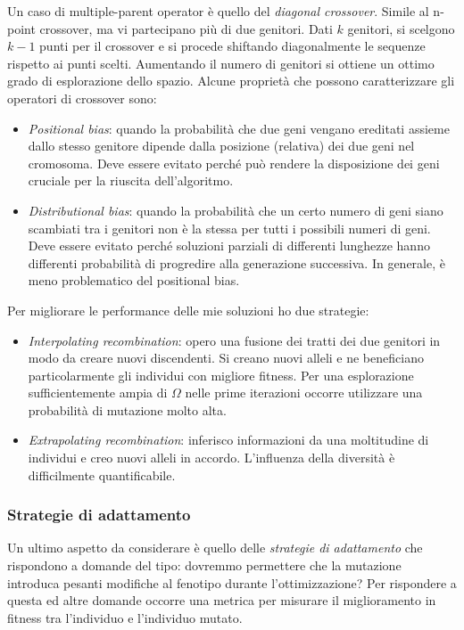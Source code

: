 \documentclass[10pt,a4paper]{article}
\begin{document}
Un caso di multiple-parent operator è quello del \emph{diagonal crossover}. Simile al n-point crossover, ma vi partecipano più di due genitori. Dati $k$ genitori, si scelgono $k-1$ punti per il crossover e si procede shiftando diagonalmente le sequenze rispetto ai punti scelti. Aumentando il numero di genitori si ottiene un ottimo grado di esplorazione dello spazio. Alcune proprietà che possono caratterizzare gli operatori di crossover sono:

\begin{itemize}
\item{\emph{Positional bias}: quando la probabilità che due geni vengano ereditati assieme dallo stesso genitore dipende dalla posizione (relativa) dei due geni nel cromosoma. Deve essere evitato perché può rendere la disposizione dei geni cruciale per la riuscita dell'algoritmo.}
\item{\emph{Distributional bias}: quando la probabilità che un certo numero di geni siano scambiati tra i genitori non è la stessa per tutti i possibili numeri di geni. Deve essere evitato perché soluzioni parziali di differenti lunghezze hanno differenti probabilità di progredire alla generazione successiva. In generale, è meno problematico del positional bias.}
\end{itemize}

Per migliorare le performance delle mie soluzioni ho due strategie:

\begin{itemize}
\item{\emph{Interpolating recombination}: opero una fusione dei tratti dei due genitori in modo da creare nuovi discendenti. Si creano nuovi alleli e ne beneficiano particolarmente gli individui con migliore fitness. Per una esplorazione sufficientemente ampia di $\Omega$ nelle prime iterazioni occorre utilizzare una probabilità di mutazione molto alta.}
\item{\emph{Extrapolating recombination}: inferisco informazioni da una moltitudine di individui e creo nuovi alleli in accordo. L'influenza della diversità è difficilmente quantificabile.}
\end{itemize}

\subsubsection{Strategie di adattamento}

Un ultimo aspetto da considerare è quello delle \emph{strategie di adattamento} che rispondono a domande del tipo: dovremmo permettere che la mutazione introduca pesanti modifiche al fenotipo durante l'ottimizzazione? Per rispondere a questa ed altre domande occorre una metrica per misurare il miglioramento in fitness tra l'individuo e l'individuo mutato. 
\end{document}
